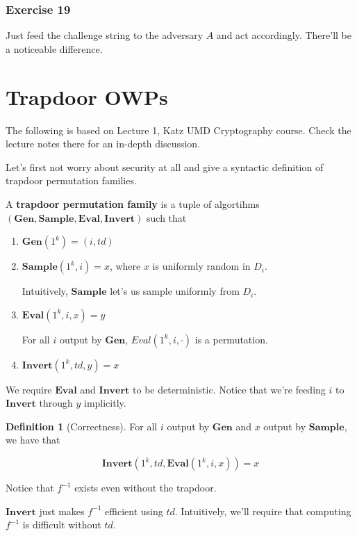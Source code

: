 \documentclass{article}
\theoremstyle{definition}
\newtheorem{definition}{Definition}
\newcommand{\Gen}{\textbf{Gen}}
\newcommand{\Sample}{\textbf{Sample}}
\newcommand{\Eval}{\textbf{Eval}}
\newcommand{\Invert}{\textbf{Invert}}
\begin{document}
\subsubsection{Exercise 19}

Just feed the challenge string to the adversary $A$ and act accordingly.
There'll be a noticeable difference.

\newpage

\section{Trapdoor OWPs}

The following is based on Lecture 1, Katz UMD Cryptography course. Check the
lecture notes there for an in-depth discussion.

Let's first not worry about security at all and give a syntactic definition
of trapdoor permutation families.

A \textbf{trapdoor permutation family} is a tuple of algortihms
$(\Gen, \Sample, \Eval, \Invert)$ such that 

\begin{enumerate}
    \item $\Gen(1^{k}) = (i, td)$
    \item $\Sample(1^{k}, i) = x$, where $x$
    is uniformly random in $D_{i}$.
    
    Intuitively, $\Sample$ let's us sample uniformly from $D_{i}$.
    \item $\Eval(1^{k},i,x) = y$
    
    For all $i$ output by $\Gen$, $Eval(1^{k},i, \cdot)$ is a permutation.
    \item $\Invert(1^{k}, td, y) = x$
\end{enumerate}

We require $\Eval$ and $\Invert$ to be deterministic.
Notice that we're feeding $i$ to $\Invert$ through $y$ implicitly.

\begin{definition}[Correctness]
    For all $i$ output by $\Gen$ and $x$ output by $\Sample$, we have that

    \[ \Invert(1^{k},td, \Eval(1^{k}, i, x)) = x\]
\end{definition}

Notice that $f^{-1}$ exists even without the trapdoor.

$\Invert$ just makes $f^{-1}$ efficient using $td$. Intuitively,
we'll require that computing $f^{-1}$ is difficult without $td$.
\end{document}
